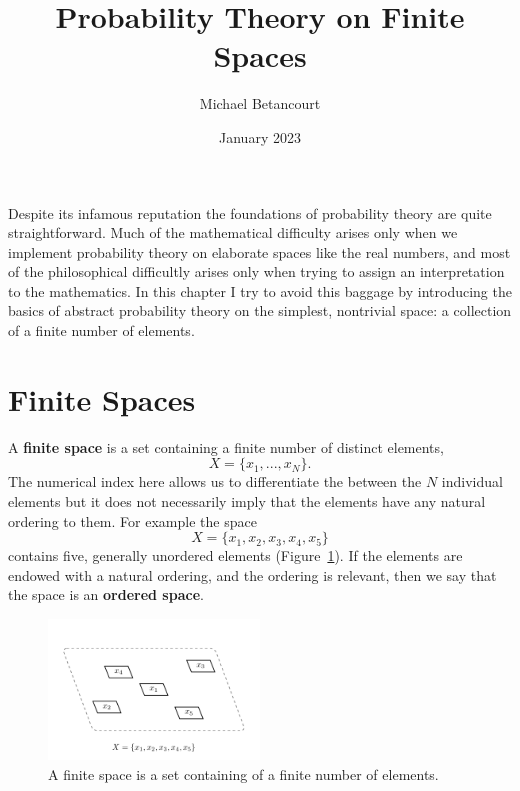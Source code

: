 \documentclass[
  letterpaper,
  DIV=11,
  numbers=noendperiod]{scrartcl}
\title{Probability Theory on Finite Spaces}
\author{Michael Betancourt}
\date{January 2023}
\renewcommand*\contentsname{Table of contents}
\newcommand\contentsname{Table of contents}
\begin{document}
\maketitle
\ifdefined\Shaded\renewenvironment{Shaded}{\begin{tcolorbox}[sharp corners, frame hidden, borderline west={3pt}{0pt}{shadecolor}, interior hidden, boxrule=0pt, enhanced, breakable]}{\end{tcolorbox}}\fi

\renewcommand*\contentsname{Table of contents}
{
\hypersetup{linkcolor=}
\setcounter{tocdepth}{3}
\tableofcontents
}
Despite its infamous reputation the foundations of probability theory
are quite straightforward. Much of the mathematical difficulty arises
only when we implement probability theory on elaborate spaces like the
real numbers, and most of the philosophical difficultly arises only when
trying to assign an interpretation to the mathematics. In this chapter I
try to avoid this baggage by introducing the basics of abstract
probability theory on the simplest, nontrivial space: a collection of a
finite number of elements.

\hypertarget{finite-spaces}{%
\section{Finite Spaces}\label{finite-spaces}}

A \textbf{finite space} is a set containing a finite number of distinct
elements, \[
X = \{x_1, ..., x_N\}.
\] The numerical index here allows us to differentiate the between the
\(N\) individual elements but it does not necessarily imply that the
elements have any natural ordering to them. For example the space \[
X = \{x_1, x_2, x_3, x_4, x_5\}
\] contains five, generally unordered elements
(Figure~\ref{fig-ambient_space}). If the elements are endowed with a
natural ordering, and the ordering is relevant, then we say that the
space is an \textbf{ordered space}.

\begin{figure}

{\centering \includegraphics[width=0.5\textwidth,height=\textheight]{figures/ambient_space/ambient_space.pdf}

}

\caption{\label{fig-ambient_space}A finite space is a set containing of
a finite number of elements.}

\end{figure}
\end{document}
